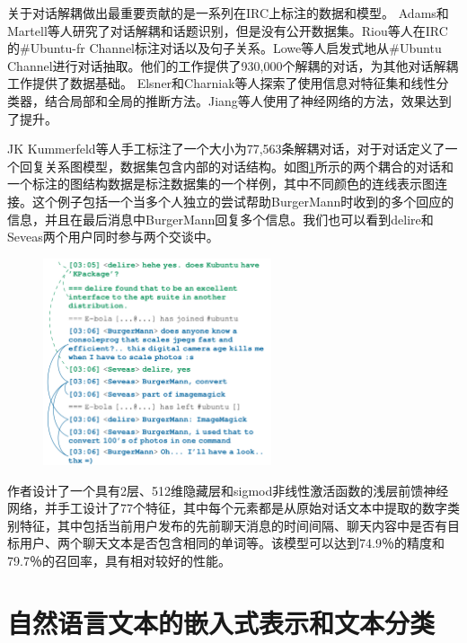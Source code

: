 关于对话解耦做出最重要贡献的是一系列在IRC上标注的数据和模型。
Adams和 Martell等人\cite{adams2008topic}研究了对话解耦和话题识别，但是没有公开数据集。Riou等人\cite{riou2015using}在IRC的\#Ubuntu-fr Channel标注对话以及句子关系。Lowe等人\cite{lasecki2013conversations}启发式地从\#Ubuntu Channel进行对话抽取。他们的工作提供了930,000个解耦的对话，为其他对话解耦工作提供了数据基础。
Elsner和Charniak等人\cite{elsner2008you}探索了使用信息对特征集和线性分类器，结合局部和全局的推断方法。Jiang等人\cite{jiang2018learning}使用了神经网络的方法，效果达到了提升。

JK Kummerfeld等人\cite{kummerfeld2018large}手工标注了一个大小为77,563条解耦对话，对于对话定义了一个回复关系图模型，数据集包含内部的对话结构。如图\ref{fig:example-conversation}所示的两个耦合的对话和一个标注的图结构数据是标注数据集的一个样例，其中不同颜色的连线表示图连接。这个例子包括一个当多个人独立的尝试帮助BurgerMann时收到的多个回应的信息，并且在最后消息中BurgerMann回复多个信息。我们也可以看到delire和Seveas两个用户同时参与两个交谈中。
\begin{figure}[htbp]
    \centering
    \includegraphics[width=0.6\textwidth]{Img/example-conversation.png}
    \label{fig:example-conversation}
\end{figure}
作者设计了一个具有2层、512维隐藏层和sigmod非线性激活函数的浅层前馈神经网络，并手工设计了77个特征，其中每个元素都是从原始对话文本中提取的数字类别特征，其中包括当前用户发布的先前聊天消息的时间间隔、聊天内容中是否有目标用户、两个聊天文本是否包含相同的单词等。该模型可以达到74.9％的精度和79.7％的召回率，具有相对较好的性能。

\section{自然语言文本的嵌入式表示和文本分类}
